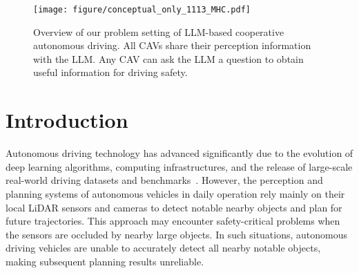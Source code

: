 \begin{figure}[!t]
\centering
\texttt{[image: figure/conceptual\_only\_1113\_MHC.pdf]}
\caption[]
        {Overview of our problem setting of LLM-based cooperative autonomous driving. All CAVs share their perception information with the LLM. Any CAV can ask the LLM a question to obtain useful information for driving safety.} 
        \vspace{-15pt}
        \label{fig:conceptual_only}
\end{figure}

\section{Introduction}
Autonomous driving technology has advanced significantly due to the evolution of deep learning algorithms, computing infrastructures, and the release of large-scale real-world driving datasets and benchmarks~\cite{geiger2012kitti, caesar2019nuscenes, sun2020waymo}. However, the perception and planning systems of autonomous vehicles in daily operation rely mainly on their local LiDAR sensors and cameras to detect notable nearby objects and plan for future trajectories. This approach may encounter safety-critical problems when the sensors are occluded by nearby large objects. In such situations, autonomous driving vehicles are unable to accurately detect all nearby notable objects, making subsequent planning results unreliable.

